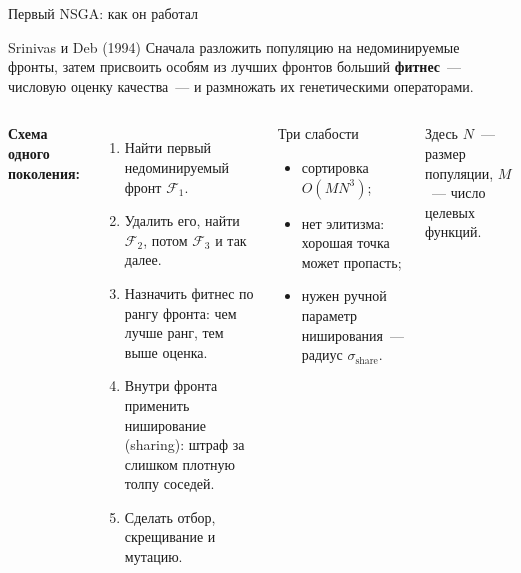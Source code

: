 \documentclass[aspectratio=169,11pt]{beamer}
\begin{document}
\begin{frame}{Первый NSGA: как он работал}\small
  \begin{exampleblock}{Srinivas и Deb (1994)}
    Сначала разложить популяцию на недоминируемые фронты, затем присвоить особям из лучших фронтов больший \textbf{фитнес}~--- числовую оценку качества~--- и размножать их генетическими операторами.
  \end{exampleblock}
  \vspace{0.15cm}
  \begin{columns}[T]
      \textbf{Схема одного поколения:}
      \begin{enumerate}\footnotesize
        \item Найти первый недоминируемый фронт $\mathcal{F}_1$.
        \item Удалить его, найти $\mathcal{F}_2$, потом $\mathcal{F}_3$ и так далее.
        \item Назначить фитнес по рангу фронта: чем лучше ранг, тем выше оценка.
        \item Внутри фронта применить ниширование (sharing): штраф за слишком плотную толпу соседей.
        \item Сделать отбор, скрещивание и мутацию.
      \end{enumerate}
      \begin{alertblock}{Три слабости}
        \begin{itemize}\footnotesize
          \item сортировка $O(MN^3)$;
          \item нет элитизма: хорошая точка может пропасть;
          \item нужен ручной параметр ниширования~--- радиус $\sigma_{\mathrm{share}}$.
        \end{itemize}
      \end{alertblock}
      \footnotesize
      Здесь $N$~--- размер популяции, $M$~--- число целевых функций.
  \end{columns}
\end{frame}
\end{document}
